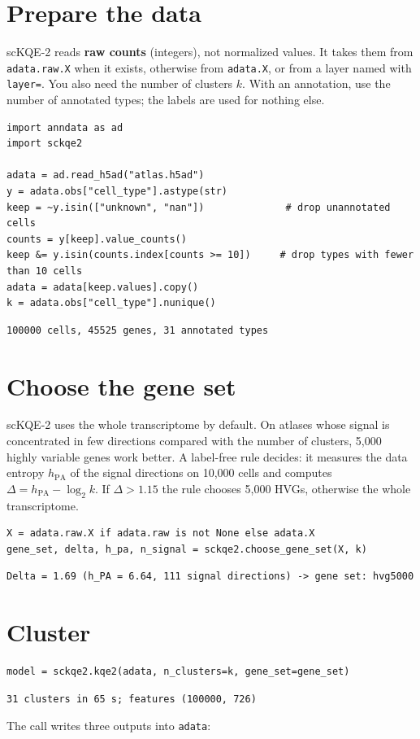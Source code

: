 \documentclass[11pt]{article}
\begin{document}
\section{Prepare the data}
scKQE-2 reads \textbf{raw counts} (integers), not normalized values. It takes them from \texttt{adata.raw.X} when it exists, otherwise from \texttt{adata.X}, or from a layer named with \texttt{layer=}. You also need the number of clusters $k$. With an annotation, use the number of annotated types; the labels are used for nothing else.
\begin{lstlisting}
import anndata as ad
import sckqe2

adata = ad.read_h5ad("atlas.h5ad")
y = adata.obs["cell_type"].astype(str)
keep = ~y.isin(["unknown", "nan"])              # drop unannotated cells
counts = y[keep].value_counts()
keep &= y.isin(counts.index[counts >= 10])     # drop types with fewer than 10 cells
adata = adata[keep.values].copy()
k = adata.obs["cell_type"].nunique()
\end{lstlisting}
\begin{lstlisting}[style=out]
100000 cells, 45525 genes, 31 annotated types
\end{lstlisting}

\section{Choose the gene set}
scKQE-2 uses the whole transcriptome by default. On atlases whose signal is concentrated in few directions compared with the number of clusters, 5,000 highly variable genes work better. A label-free rule decides: it measures the data entropy $h_{\mathrm{PA}}$ of the signal directions on 10,000 cells and computes $\Delta = h_{\mathrm{PA}} - \log_2 k$. If $\Delta > 1.15$ the rule chooses 5,000 HVGs, otherwise the whole transcriptome.
\begin{lstlisting}
X = adata.raw.X if adata.raw is not None else adata.X
gene_set, delta, h_pa, n_signal = sckqe2.choose_gene_set(X, k)
\end{lstlisting}
\begin{lstlisting}[style=out]
Delta = 1.69 (h_PA = 6.64, 111 signal directions) -> gene set: hvg5000
\end{lstlisting}

\section{Cluster}
\begin{lstlisting}
model = sckqe2.kqe2(adata, n_clusters=k, gene_set=gene_set)
\end{lstlisting}
\begin{lstlisting}[style=out]
31 clusters in 65 s; features (100000, 726)
\end{lstlisting}
The call writes three outputs into \texttt{adata}:
\end{document}
